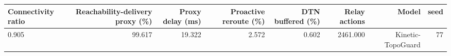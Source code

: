 \begin{tabular}{lrrrrrrr}
\toprule
Connectivity ratio & Reachability-delivery proxy (\%) & Proxy delay (ms) & Proactive reroute (\%) & DTN buffered (\%) & Relay actions & Model & seed \\
\midrule
0.905 & 99.617 & 19.322 & 2.572 & 0.602 & 2461.000 & Kinetic-TopoGuard & 77 \\
\bottomrule
\end{tabular}